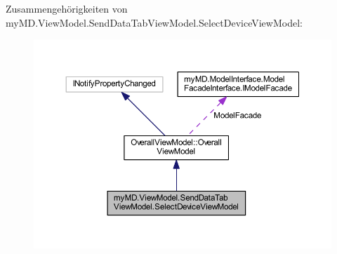 Zusammengehörigkeiten von my\+M\+D.\+View\+Model.\+Send\+Data\+Tab\+View\+Model.\+Select\+Device\+View\+Model\+:
\nopagebreak
\begin{figure}[H]
\begin{center}
\leavevmode
\includegraphics[width=350pt]{classmy_m_d_1_1_view_model_1_1_send_data_tab_view_model_1_1_select_device_view_model__coll__graph}
\end{center}
\end{figure}
